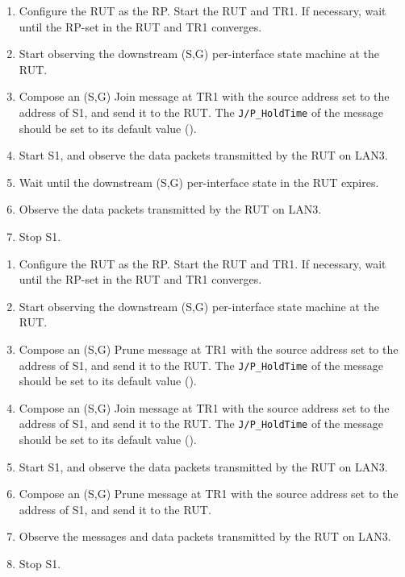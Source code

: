 \documentclass[11pt]{report}
\begin{document}
\begin{enumerate}

  \item Configure the RUT as the RP. Start the RUT and TR1. If
  necessary, wait until the RP-set in the RUT and TR1 converges.

  \item Start observing the downstream (S,G) per-interface state
  machine at the RUT.

  \item Compose an (S,G) Join message at TR1 with the source address set
  to the address of S1, and send it to the RUT.
  The \verb=J/P_HoldTime= of the message should be set to its default
  value ({\PimsmJPHoldTime}).

  \item Start S1, and observe the data packets transmitted by the RUT on
  LAN3.

  \item Wait until the downstream (S,G) per-interface state in the RUT
  expires.

  \item Observe the data packets transmitted by the RUT on LAN3.

  \item Stop S1.

\end{enumerate}


\begin{enumerate}

  \item Configure the RUT as the RP. Start the RUT and TR1. If
  necessary, wait until the RP-set in the RUT and TR1 converges.

  \item Start observing the downstream (S,G) per-interface state
  machine at the RUT.

  \item Compose an (S,G) Prune message at TR1 with the source address set
  to the address of S1, and send it to the RUT.
  The \verb=J/P_HoldTime= of the message should be set to its default
  value ({\PimsmJPHoldTime}).

  \item Compose an (S,G) Join message at TR1 with the source address set
  to the address of S1, and send it to the RUT.
  The \verb=J/P_HoldTime= of the message should be set to its default
  value ({\PimsmJPHoldTime}).

  \item Start S1, and observe the data packets transmitted by the RUT on
  LAN3.

  \item Compose an (S,G) Prune message at TR1 with the source address set
  to the address of S1, and send it to the RUT.

  \item Observe the messages and data packets transmitted by the RUT on
  LAN3.

  \item Stop S1.

\end{enumerate}
\end{document}
